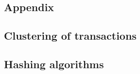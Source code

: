 
\begin{appendices}
\renewcommand{\appendixname}{APPENDIX}
\renewcommand{\appendixtocname}{\appendixname}
\addappheadtotoc


\part*{Appendix}

\chapter*{Clustering of transactions}
\label{cha:apdx_clustering_tx}


\chapter*{Hashing algorithms}
\label{cha:apdx_hashing_alg}


\end{appendices}
